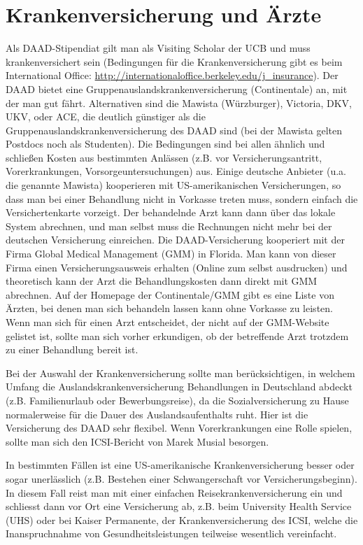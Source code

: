 \documentclass[a4paper]{scrreprt}
\begin{document}
\section{Krankenversicherung und Ärzte}

Als DAAD-Stipendiat gilt man als Visiting Scholar der UCB und muss krankenversichert sein (Bedingungen für die Krankenversicherung gibt es beim International Office:  \url{http://internationaloffice.berkeley.edu/j\_insurance}). Der DAAD bietet eine Gruppenauslandskrankenversicherung (Continentale) an, mit der man gut fährt. Alternativen sind die Mawista (Würzburger), Victoria, DKV, UKV, oder ACE, die deutlich günstiger als die Gruppenauslandskrankenversicherung des DAAD sind (bei der Mawista gelten Postdocs noch als Studenten). Die Bedingungen sind bei allen ähnlich und schließen Kosten aus bestimmten Anlässen (z.B. vor Versicherungsantritt, Vorerkrankungen, Vorsorgeuntersuchungen) aus. Einige deutsche Anbieter (u.a. die genannte Mawista) kooperieren mit US-amerikanischen Versicherungen, so dass man bei einer Behandlung nicht in Vorkasse treten muss, sondern einfach die Versichertenkarte vorzeigt. Der behandelnde Arzt kann dann über das lokale System abrechnen, und man selbst muss die Rechnungen nicht mehr bei der deutschen Versicherung einreichen. Die DAAD-Versicherung kooperiert mit der Firma Global Medical Management (GMM) in Florida. Man kann von dieser Firma einen Versicherungsausweis erhalten (Online zum selbst ausdrucken) und theoretisch kann der Arzt die Behandlungskosten dann direkt mit GMM abrechnen. Auf der Homepage der Continentale/GMM gibt es eine Liste von Ärzten, bei denen man sich behandeln lassen kann ohne Vorkasse zu leisten.
Wenn man sich für einen Arzt entscheidet, der nicht auf der GMM-Website gelistet ist, sollte man sich vorher erkundigen, ob der betreffende Arzt trotzdem zu einer Behandlung bereit ist.

Bei der Auswahl der Krankenversicherung sollte man berücksichtigen, in welchem Umfang die Auslandskrankenversicherung Behandlungen in Deutschland abdeckt (z.B. Familienurlaub oder Bewerbungsreise), da die Sozialversicherung zu Hause normalerweise für die Dauer des Auslandsaufenthalts ruht. Hier ist die Versicherung des DAAD sehr flexibel. Wenn Vorerkrankungen eine Rolle spielen, sollte man sich den ICSI-Bericht von Marek Musial besorgen.

In bestimmten Fällen ist eine US-amerikanische Krankenversicherung besser oder sogar unerlässlich (z.B. Bestehen einer Schwangerschaft vor Versicherungsbeginn). In diesem Fall reist man mit einer einfachen Reisekrankenversicherung ein und schliesst dann vor Ort eine Versicherung ab, z.B. beim University Health Service (UHS) oder bei Kaiser Permanente, der Krankenversicherung des ICSI, welche die Inanspruchnahme von Gesundheitsleistungen teilweise wesentlich vereinfacht.
\end{document}
